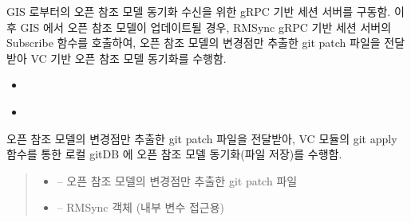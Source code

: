 \documentclass[a4paper,10pt,english]{sphinxmanual}
\begin{document}
\begin{fulllineitems}
\begin{fulllineitems}
\label{\detokenize{_RMSync:RMSync._setRMSyncServer}}
\pysigstartsignatures
{}
\pysigstopsignatures
\sphinxAtStartPar
GIS 로부터의 오픈 참조 모델 동기화 수신을 위한 gRPC 기반 세션 서버를 구동함.
이후 GIS 에서 오픈 참조 모델이 업데이트될 경우, RMSync gRPC 기반 세션 서버의 Subscribe 함수를 호출하여,
오픈 참조 모델의 변경점만 추출한 git patch 파일을 전달받아 VC 기반 오픈 참조 모델 동기화를 수행함.


\nopagebreak

\begin{itemize}
\item {} 
\sphinxAtStartPar
{\hyperref[\detokenize{_RMSync:RMSync.run}]{}}

\item {} 
\sphinxAtStartPar
{\hyperref[\detokenize{_RMSync:RMSync.Subscribe}]{}}

\end{itemize}



\end{fulllineitems}


\begin{fulllineitems}
\label{\detokenize{_RMSync:RMSync.gitPatch}}
\pysigstartsignatures
{}
\pysigstopsignatures
\sphinxAtStartPar
오픈 참조 모델의 변경점만 추출한 git patch 파일을 전달받아, VC 모듈의 git apply 함수를 통한
로컬 gitDB 에 오픈 참조 모델 동기화(파일 저장)를 수행함.
\begin{quote}\begin{description}
\begin{itemize}
\item {} 
\sphinxAtStartPar
{} – 오픈 참조 모델의 변경점만 추출한 git patch 파일

\item {} 
\sphinxAtStartPar
{} – RMSync 객체 (내부 변수 접근용)


\end{itemize}
\end{description}
\end{quote}
\end{fulllineitems}
\end{fulllineitems}
\end{document}
